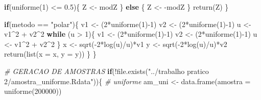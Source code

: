 \documentclass[
]{article}
\newenvironment{Shaded}{\begin{snugshade}}{\end{snugshade}}
\newcommand{\AttributeTok}[1]{\textcolor[rgb]{0.77,0.63,0.00}{#1}}
\newcommand{\CommentTok}[1]{\textcolor[rgb]{0.56,0.35,0.01}{\textit{#1}}}
\newcommand{\ControlFlowTok}[1]{\textcolor[rgb]{0.13,0.29,0.53}{\textbf{#1}}}
\newcommand{\DecValTok}[1]{\textcolor[rgb]{0.00,0.00,0.81}{#1}}
\newcommand{\FloatTok}[1]{\textcolor[rgb]{0.00,0.00,0.81}{#1}}
\newcommand{\FunctionTok}[1]{\textcolor[rgb]{0.00,0.00,0.00}{#1}}
\newcommand{\NormalTok}[1]{#1}
\newcommand{\OtherTok}[1]{\textcolor[rgb]{0.56,0.35,0.01}{#1}}
\newcommand{\SpecialCharTok}[1]{\textcolor[rgb]{0.00,0.00,0.00}{#1}}
\newcommand{\StringTok}[1]{\textcolor[rgb]{0.31,0.60,0.02}{#1}}
\begin{document}
\begin{Shaded}
\begin{Highlighting}[]
    \ControlFlowTok{if}\NormalTok{(}\FunctionTok{uniforme}\NormalTok{(}\DecValTok{1}\NormalTok{) }\SpecialCharTok{\textless{}=} \FloatTok{0.5}\NormalTok{)\{}
\NormalTok{      Z }\OtherTok{\textless{}{-}}\NormalTok{ modZ}
\NormalTok{    \} }\ControlFlowTok{else}\NormalTok{ \{}
\NormalTok{      Z }\OtherTok{\textless{}{-}} \SpecialCharTok{{-}}\NormalTok{modZ}
\NormalTok{    \}}
    \FunctionTok{return}\NormalTok{(Z)}
\NormalTok{  \}}
  
  \ControlFlowTok{if}\NormalTok{(metodo }\SpecialCharTok{==} \StringTok{"polar"}\NormalTok{)\{}
\NormalTok{    v1 }\OtherTok{\textless{}{-}}\NormalTok{ (}\DecValTok{2}\SpecialCharTok{*}\FunctionTok{uniforme}\NormalTok{(}\DecValTok{1}\NormalTok{)}\SpecialCharTok{{-}}\DecValTok{1}\NormalTok{)}
\NormalTok{    v2 }\OtherTok{\textless{}{-}}\NormalTok{ (}\DecValTok{2}\SpecialCharTok{*}\FunctionTok{uniforme}\NormalTok{(}\DecValTok{1}\NormalTok{)}\SpecialCharTok{{-}}\DecValTok{1}\NormalTok{)}
\NormalTok{    u }\OtherTok{\textless{}{-}}\NormalTok{ v1}\SpecialCharTok{\^{}}\DecValTok{2} \SpecialCharTok{+}\NormalTok{ v2}\SpecialCharTok{\^{}}\DecValTok{2}
    \ControlFlowTok{while}\NormalTok{ (u }\SpecialCharTok{\textgreater{}} \DecValTok{1}\NormalTok{)\{}
\NormalTok{      v1 }\OtherTok{\textless{}{-}}\NormalTok{ (}\DecValTok{2}\SpecialCharTok{*}\FunctionTok{uniforme}\NormalTok{(}\DecValTok{1}\NormalTok{)}\SpecialCharTok{{-}}\DecValTok{1}\NormalTok{)}
\NormalTok{      v2 }\OtherTok{\textless{}{-}}\NormalTok{ (}\DecValTok{2}\SpecialCharTok{*}\FunctionTok{uniforme}\NormalTok{(}\DecValTok{1}\NormalTok{)}\SpecialCharTok{{-}}\DecValTok{1}\NormalTok{)}
\NormalTok{      u }\OtherTok{\textless{}{-}}\NormalTok{ v1}\SpecialCharTok{\^{}}\DecValTok{2} \SpecialCharTok{+}\NormalTok{ v2}\SpecialCharTok{\^{}}\DecValTok{2}
\NormalTok{    \}}
\NormalTok{    x }\OtherTok{\textless{}{-}} \FunctionTok{sqrt}\NormalTok{(}\SpecialCharTok{{-}}\DecValTok{2}\SpecialCharTok{*}\FunctionTok{log}\NormalTok{(u)}\SpecialCharTok{/}\NormalTok{u)}\SpecialCharTok{*}\NormalTok{v1}
\NormalTok{    y }\OtherTok{\textless{}{-}} \FunctionTok{sqrt}\NormalTok{(}\SpecialCharTok{{-}}\DecValTok{2}\SpecialCharTok{*}\FunctionTok{log}\NormalTok{(u)}\SpecialCharTok{/}\NormalTok{u)}\SpecialCharTok{*}\NormalTok{v2}
    \FunctionTok{return}\NormalTok{(}\FunctionTok{list}\NormalTok{(}\AttributeTok{x =}\NormalTok{ x, }\AttributeTok{y =}\NormalTok{ y))}
\NormalTok{  \}}
\NormalTok{\}}

\CommentTok{\# GERACAO DE AMOSTRAS}
\ControlFlowTok{if}\NormalTok{(}\SpecialCharTok{!}\FunctionTok{file.exists}\NormalTok{(}\StringTok{"../trabalho pratico 2/amostra\_uniforme.Rdata"}\NormalTok{))\{}
  \CommentTok{\# uniforme}
\NormalTok{  am\_uni }\OtherTok{\textless{}{-}} \FunctionTok{data.frame}\NormalTok{(}\AttributeTok{amostra =} \FunctionTok{uniforme}\NormalTok{(}\DecValTok{200000}\NormalTok{))}
  

\end{Highlighting}
\end{Shaded}
\end{document}
